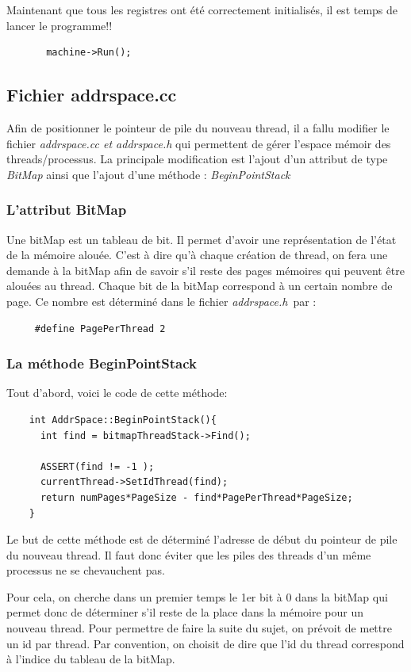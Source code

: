 \documentclass[a4paper,10pt]{article}
\begin{document}
      Maintenant que tous les registres ont été correctement initialisés, il est temps de lancer le programme!!
      \begin{lstlisting}
       machine->Run();
      \end{lstlisting}
  
 \subsection{Fichier addrspace.cc}
  Afin de positionner le pointeur de pile du nouveau thread, il a fallu modifier le fichier \emph{addrspace.cc et addrspace.h} qui permettent de gérer 
  l'espace mémoir des threads/processus. La principale modification est l'ajout d'un attribut de type \emph{BitMap} ainsi que l'ajout d'une méthode :
  \emph{BeginPointStack}
  
  \subsubsection*{L'attribut BitMap}
    Une bitMap est un tableau de bit. Il permet d'avoir une représentation de l'état de la mémoire alouée. C'est à dire qu'à chaque création de thread,
    on fera une demande à la bitMap afin de savoir s'il reste des pages mémoires qui peuvent être alouées au thread. Chaque bit de la bitMap correspond à
    un certain nombre de page. Ce nombre est déterminé dans le fichier \emph{addrspace.h} par : 
    \begin{lstlisting}
     #define PagePerThread 2
    \end{lstlisting}
    \newpage
   \subsubsection*{La méthode BeginPointStack}
   Tout d'abord, voici le code de cette méthode:
      \begin{lstlisting}
    int AddrSpace::BeginPointStack(){
      int find = bitmapThreadStack->Find();

      ASSERT(find != -1 );
      currentThread->SetIdThread(find);
      return numPages*PageSize - find*PagePerThread*PageSize;
    }
      \end{lstlisting}
   Le but de cette méthode est de déterminé l'adresse de début du pointeur de pile du nouveau thread. Il faut donc éviter que les piles des threads 
   d'un même processus ne se chevauchent pas.
   
   Pour cela, on cherche dans un premier temps le 1er bit à 0 dans la bitMap qui permet donc de déterminer s'il reste de la place dans la mémoire pour un
   nouveau thread. Pour permettre de faire la suite du sujet, on prévoit de mettre un id par thread. Par convention, on choisit de dire que l'id du thread
   correspond à l'indice du tableau de la bitMap.
\end{document}
